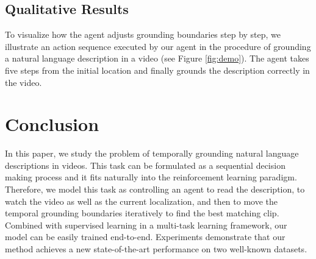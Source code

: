 \documentclass[letterpaper]{article} %
\begin{document}
\subsection{Qualitative Results}
To visualize how the agent adjusts grounding boundaries step by step, we illustrate an action sequence executed by our agent in the procedure of grounding a natural language description in a video (see Figure \ref{fig:demo}). The agent takes five steps from the initial location and finally grounds the description correctly in the video.

\section{Conclusion}
In this paper, we study the problem of temporally grounding natural language descriptions in videos. This task can be formulated as a sequential decision making process and it  fits naturally into the reinforcement learning paradigm.
Therefore, we model this task as controlling an agent to read the description, to watch the video as well as the current localization, and then to move the temporal grounding boundaries iteratively to find the best matching clip. Combined with supervised learning in a multi-task learning framework, our model can be easily trained end-to-end. Experiments demonstrate that our method achieves a new state-of-the-art performance on two well-known datasets.



\end{document}
